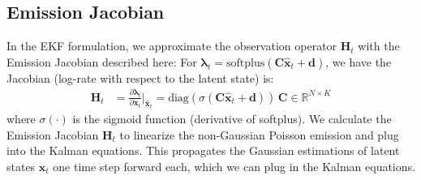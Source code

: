\documentclass[11pt,letterpaper]{article} %
\begin{document}
\subsection*{Emission Jacobian}
In the EKF formulation, we approximate the observation operator $\bm{H}_t$ with the Emission Jacobian described here:
For $\boldsymbol{\lambda}_t = \text{softplus}(\bm{C}\hat{\bm{x}}_t + \bm{d})$, we have the Jacobian (log-rate with respect to the latent state) is:
\begin{align*}
    \bm{H}_t &= \frac{\partial \boldsymbol{\lambda}_t}{\partial \bm{x}_t}\Bigg|_{\hat{\bm{x}}_t}
                 = \text{diag}(\sigma(\bm{C}\hat{\bm{x}}_t + \bm{d}))\,\bm{C}
                 \in \mathbb{R}^{N \times K}
\end{align*}
where $\sigma(\cdot)$ is the sigmoid function (derivative of softplus). We calculate the Emission Jacobian $\bm{H}_t$ to linearize the non-Gaussian Poisson emission and plug into the Kalman equations. This propagates the Gaussian estimations of latent states $\bm{x}_t$ one time step forward each, which we can plug in the Kalman equations.
\end{document}
